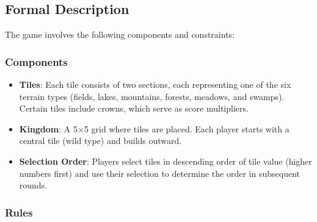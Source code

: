 \documentclass[conference]{IEEEtran}
\begin{document}
\subsection{Formal Description}

The game involves the following components and constraints:

\subsubsection{Components}

\begin{itemize}
    \item \textbf{Tiles}: Each tile consists of two sections, each representing one of the six terrain types (fields, lakes, mountains, forests, meadows, and swamps). Certain tiles include crowns, which serve as score multipliers.
    \item \textbf{Kingdom}: A 5$\times$5 grid where tiles are placed. Each player starts with a central tile (wild type) and builds outward.
    \item \textbf{Selection Order}: Players select tiles in descending order of tile value (higher numbers first) and use their selection to determine the order in subsequent rounds.
\end{itemize}

\subsubsection{Rules}
\end{document}
